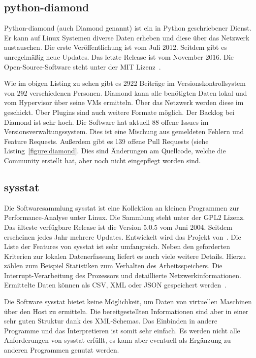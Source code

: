 \subsection{python-diamond}
Python-diamond (auch Diamond genannt) ist ein in Python geschriebener Dienst.
Er kann auf Linux Systemen diverse Daten erheben und diese über das Netzwerk
austauschen. Die erste Veröffentlichung ist vom Juli 2012. Seitdem gibt es
unregelmäßig neue Updates. Das letzte Release ist vom November 2016. Die
Open-Source-Software steht unter der MIT Lizenz~\cite{python-diamond}.



Wie im obigen Listing zu sehen gibt es 2922 Beiträge im Versionskontrollsystem
von 292 verschiedenen Personen. Diamond kann alle benötigten Daten lokal und
vom Hypervisor über seine VMs ermitteln. Über das Netzwerk werden diese im
 geschickt. Über Plugins sind auch weitere
Formate möglich. Der \gls{Backlog} bei Diamond ist sehr hoch. Die Software hat
aktuell 88 offene Issues im Versionsverwaltungssystem. Dies ist eine Mischung
aus gemeldeten Fehlern und Feature Requests. Außerdem gibt es 139 offene Pull
Requests (siehe Listing~\ref{figure:diamond}. Dies sind Änderungen am
Quellcode, welche die Community erstellt hat, aber noch nicht eingepflegt
worden sind.
\tm%

\subsection{sysstat}
Die Softwaresammlung sysstat ist eine Kollektion an kleinen Programmen zur
Performance-Analyse unter Linux. Die Sammlung steht unter der GPL2 Lizenz. Das
älteste verfügbare Release ist die Version 5.0.5 vom Juni 2004. Seitdem
erscheinen jedes Jahr mehrere Updates. Entwickelt wird das Projekt
von~\cite{systat_releases}. Die Liste der Features von sysstat ist sehr
umfangreich.  Neben den geforderten Kriterien zur lokalen Datenerfassung
liefert es auch viele weitere Details. Hierzu zählen zum Beispiel Statistiken
zum Verhalten des Arbeitsspeichers. Die Interrupt-Verarbeitung des Prozessors
und detaillierte Netzwerkinformationen. Ermittelte Daten können als \gls{CSV},
\gls{XML} oder \gls{JSON} gespeichert werden~\cite{sysstat_features}.

Die Software sysstat bietet keine Möglichkeit, um Daten von virtuellen
Maschinen über den Host zu ermitteln. Die bereitgestellten Informationen sind
aber in einer sehr guten Struktur dank des XML-Schemas. Das Einbinden in andere
Programme und das Interpretieren ist somit sehr einfach. Es werden nicht alle
Anforderungen von sysstat erfüllt, es kann aber eventuell als Ergänzung zu
anderen Programmen genutzt werden.
\tm%

